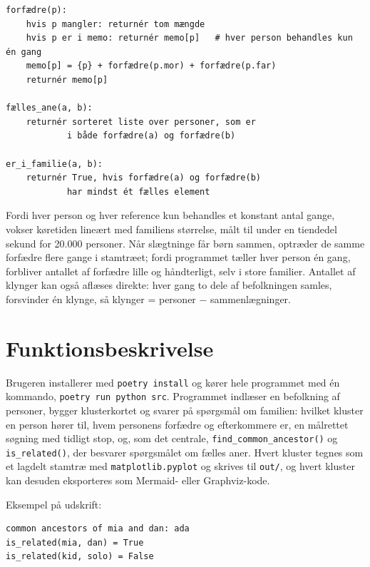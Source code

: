 \documentclass[12pt, a4paper]{article}
\begin{document}
\begin{lstlisting}[basicstyle=\ttfamily\small, numbers=none]
forfædre(p):
    hvis p mangler: returnér tom mængde
    hvis p er i memo: returnér memo[p]   # hver person behandles kun én gang
    memo[p] = {p} + forfædre(p.mor) + forfædre(p.far)
    returnér memo[p]

fælles_ane(a, b):
    returnér sorteret liste over personer, som er
            i både forfædre(a) og forfædre(b)

er_i_familie(a, b):
    returnér True, hvis forfædre(a) og forfædre(b)
            har mindst ét fælles element
\end{lstlisting}

Fordi hver person og hver reference kun behandles et konstant antal gange,
vokser køretiden lineært med familiens størrelse, målt til under en
tiendedel sekund for 20.000 personer. Når slægtninge får børn sammen, optræder de samme
forfædre flere gange i stamtræet; fordi programmet tæller hver person én gang,
forbliver antallet af forfædre lille og håndterligt, selv i store familier.
Antallet af klynger kan også aflæses direkte: hver gang to dele af befolkningen
samles, forsvinder én klynge, så klynger = personer $-$ sammenlægninger.

\section{Funktionsbeskrivelse}

Brugeren installerer med \texttt{poetry install} og kører hele programmet med
én kommando, \texttt{poetry run python src}. Programmet indlæser en befolkning
af personer, bygger klusterkortet og svarer på spørgsmål om familien:
hvilket kluster en person hører til, hvem personens forfædre og efterkommere
er, en målrettet søgning med tidligt stop, og, som det centrale,
\texttt{find\_common\_ancestor()} og \texttt{is\_related()}, der besvarer
spørgsmålet om fælles aner. Hvert kluster tegnes som et lagdelt stamtræ med
\texttt{matplotlib.pyplot} og skrives til \texttt{out/}, og hvert kluster kan
desuden eksporteres som Mermaid- eller Graphviz-kode.

Eksempel på udskrift:

\begin{lstlisting}[basicstyle=\ttfamily\footnotesize]
common ancestors of mia and dan: ada
is_related(mia, dan) = True
is_related(kid, solo) = False
\end{lstlisting}
\end{document}
